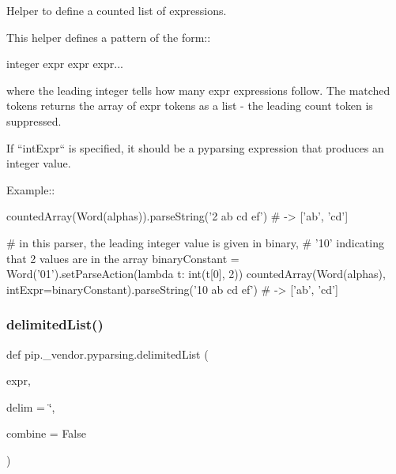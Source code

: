 \begin{DoxyVerb}Helper to define a counted list of expressions.

This helper defines a pattern of the form::

    integer expr expr expr...

where the leading integer tells how many expr expressions follow.
The matched tokens returns the array of expr tokens as a list - the
leading count token is suppressed.

If ``intExpr`` is specified, it should be a pyparsing expression
that produces an integer value.

Example::

    countedArray(Word(alphas)).parseString('2 ab cd ef')  # -> ['ab', 'cd']

    # in this parser, the leading integer value is given in binary,
    # '10' indicating that 2 values are in the array
    binaryConstant = Word('01').setParseAction(lambda t: int(t[0], 2))
    countedArray(Word(alphas), intExpr=binaryConstant).parseString('10 ab cd ef')  # -> ['ab', 'cd']
\end{DoxyVerb}
 \mbox{\label{namespacepip_1_1__vendor_1_1pyparsing_ae66a259824813f0672a0ae6cddad1e51}} 
\subsubsection{\texorpdfstring{delimited\+List()}{delimitedList()}}
{\footnotesize\ttfamily def pip.\+\_\+vendor.\+pyparsing.\+delimited\+List (\begin{DoxyParamCaption}\item[{}]{expr,  }\item[{}]{delim = {\ttfamily \char`\"{}},  }\item[{}]{combine = {\ttfamily False} }\end{DoxyParamCaption})}

